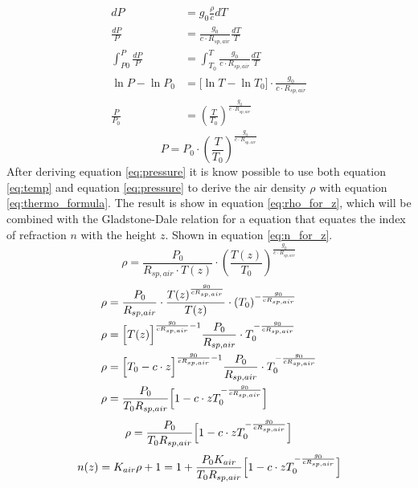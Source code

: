 \documentclass{article}
\begin{document}
\begin{align*}
	dP &= g_0 \frac{\rho}{c} dT\\
	\frac{dP}{P} &= \frac{g_0}{c\cdot R_{sp,air}}\frac{dT}{T}\\
	\int_{P0}^P \frac{dP}{P} &= \int_{T_0}^T \frac{g_0}{c\cdot R_{sp,air}}\frac{dT}{T}\\
	\ln{P}-\ln{P_0} &= \big[\ln{T} - \ln{T_0}\big] \cdot \frac{g_0}{c\cdot R_{sp,air}}\\
	\frac{P}{P_0} &= (\frac{T}{T_0})^{\frac{g_0}{c\cdot R_{sp,air}}}
\end{align*}
\begin{equation}
	P = P_0 \cdot (\frac{T}{T_0})^{\frac{g_0}{c\cdot R_{sp,air}}}
	\label{eq:pressure}
\end{equation}
After deriving equation \ref{eq:pressure} it is know possible to use both equation \ref{eq:temp} and equation \ref{eq:pressure} to derive the air density $\rho$ with equation \ref{eq:thermo_formula}. The result is show in equation \ref{eq:rho_for_z}, which will be combined with the Gladstone-Dale relation for a equation that equates the index of refraction $n$ with the height $z$. Shown in equation \ref{eq:n_for_z}.\\
\begin{equation*}
	\rho = \frac{P_0}{R_{sp,air}\cdot T(z)} \cdot(\frac{T(z)}{T_0})^{\frac{g_0}{c\cdot R_{sp,air}}}
\end{equation*}
\begin{align*}
	\rho &= \frac{P_0}{R_{sp,air}} \cdot \frac{T(z)^{\frac{g_0}{c R_{sp,air}}}}{T(z)} \cdot (T_0)^{-\frac{g_0}{c R_{sp,air}}}\\
	\rho &= \Bigl[T(z) \Bigr]^{\frac{g_0}{c R_{sp,air}} -1} \frac{P_0}{R_{sp,air}} \cdot T_0^{-\frac{g_0}{c R_{sp,air}}}\\
	\rho &= \Bigl[T_0 -c\cdot z \Bigr]^{\frac{g_0}{c R_{sp,air}} -1} \frac{P_0}{R_{sp,air}} \cdot T_0^{-\frac{g_0}{c R_{sp,air}}}\\
	\rho &= \frac{P_0}{T_0 R_{sp,air}} \Bigl[1-c\cdot z T_0^{-\frac{g_0}{c R_{sp,air}}}\Bigr]
\end{align*}
\begin{equation}
	\rho = \frac{P_0}{T_0 R_{sp,air}} \Bigl[1-c\cdot z T_0^{-\frac{g_0}{c R_{sp,air}}}\Bigr]
	\label{eq:rho_for_z}
\end{equation}
\begin{equation}
	n(z) = K_{air}\rho + 1 = 1 + \frac{P_0 K_{air}}{T_0 R_{sp,air}} \Bigl[1-c\cdot z T_0^{-\frac{g_0}{c R_{sp,air}}}\Bigr]
	\label{eq:n_for_z}
\end{equation}
\end{document}
